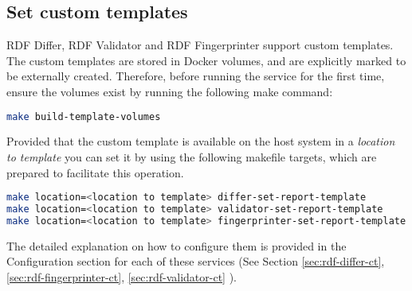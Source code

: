 	\subsection{Set custom templates}
 
	 RDF Differ, RDF Validator and RDF Fingerprinter support custom templates. The custom templates are stored in Docker volumes, and are explicitly marked to be externally created. Therefore, before running the service for the first time, ensure the volumes exist by running the following make command:

\begin{lstlisting}[language=bash,]
make build-template-volumes
\end{lstlisting}	 
	 	 
	 Provided that the custom template is available on the host system in a \textit{location to template} you can set it by using the following makefile targets, which are prepared to facilitate this operation. 
	 
\begin{lstlisting}[language=bash,]
make location=<location to template> differ-set-report-template
make location=<location to template> validator-set-report-template
make location=<location to template> fingerprinter-set-report-template
\end{lstlisting}	 	 

	The detailed explanation on how to configure them is provided in the Configuration section for each of these services (See Section \ref{sec:rdf-differ-ct}, \ref{sec:rdf-fingerprinter-ct}, \ref{sec:rdf-validator-ct} ). 
 
